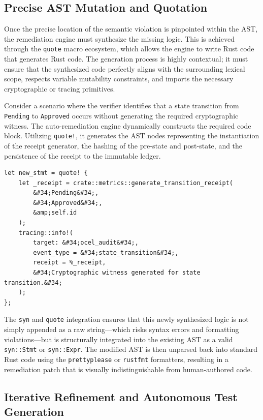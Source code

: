 \subsection{Precise AST Mutation and Quotation}

Once the precise location of the semantic violation is pinpointed within the AST, the remediation engine must synthesize the missing logic. This is achieved through the \texttt{quote} macro ecosystem, which allows the engine to write Rust code that generates Rust code. The generation process is highly contextual; it must ensure that the synthesized code perfectly aligns with the surrounding lexical scope, respects variable mutability constraints, and imports the necessary cryptographic or tracing primitives.

Consider a scenario where the verifier identifies that a state transition from \texttt{Pending} to \texttt{Approved} occurs without generating the required cryptographic witness. The auto-remediation engine dynamically constructs the required code block. Utilizing \texttt{quote!}, it generates the AST nodes representing the instantiation of the receipt generator, the hashing of the pre-state and post-state, and the persistence of the receipt to the immutable ledger. 

\begin{verbatim}
let new_stmt = quote! {
    let _receipt = crate::metrics::generate_transition_receipt(
        &#34;Pending&#34;, 
        &#34;Approved&#34;, 
        &amp;self.id
    );
    tracing::info!(
        target: &#34;ocel_audit&#34;,
        event_type = &#34;state_transition&#34;,
        receipt = %_receipt,
        &#34;Cryptographic witness generated for state transition.&#34;
    );
};
\end{verbatim}

The \texttt{syn} and \texttt{quote} integration ensures that this newly synthesized logic is not simply appended as a raw string---which risks syntax errors and formatting violations---but is structurally integrated into the existing AST as a valid \texttt{syn::Stmt} or \texttt{syn::Expr}. The modified AST is then unparsed back into standard Rust code using the \texttt{prettyplease} or \texttt{rustfmt} formatters, resulting in a remediation patch that is visually indistinguishable from human-authored code.

\subsection{Iterative Refinement and Autonomous Test Generation}

